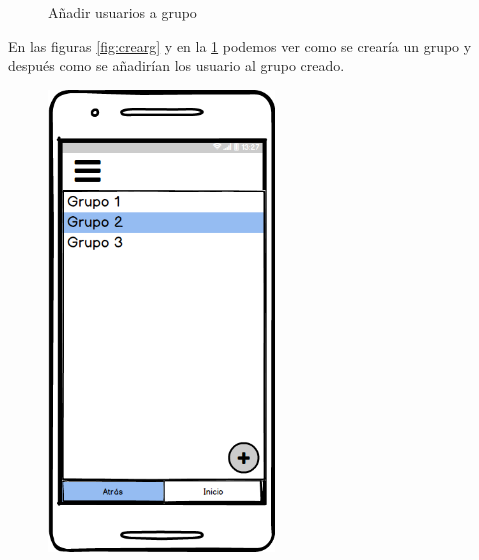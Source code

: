 \begin{figure}[htbp]
\begin{minipage}[b]{0.5\linewidth}
\caption{Añadir usuarios a grupo}
\label{fig:anadir}
\end{minipage}
\end{figure}
	
En las figuras \ref{fig:crearg} y en la \ref{fig:anadir} podemos ver como se crearía un grupo y después como se añadirían los usuario al grupo creado.
	
	
	
	\begin{figure}[H]
\begin{minipage}[b]{0.5\linewidth} %
\centering
\includegraphics[width=6cm]{maqueta/lista-grupos.png}


\end{minipage}
\end{figure}
